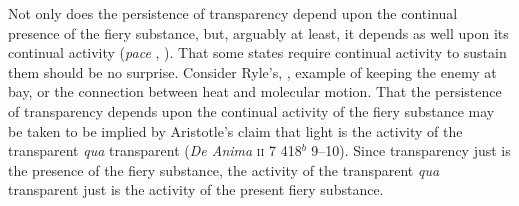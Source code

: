 Not only does the persistence of transparency depend upon the continual presence of the fiery substance, but, arguably at least, it depends as well upon its continual activity (\emph{pace} \citealt[]{Sambursky:1958aa}, \citealt[424]{Burnyeat:1995fk}). That some states require continual activity to sustain them should be no surprise. Consider Ryle's, \citeyearpar[149]{Ryle:1949qr}, example of keeping the enemy at bay, or the connection between heat and molecular motion. That the persistence of transparency depends upon the continual activity of the fiery substance may be taken to be implied by Aristotle's claim that light is the activity of the transparent \emph{qua} transparent (\emph{De Anima} \textsc{ii} 7 418\( ^{b} \) 9--10). Since transparency just is the presence of the fiery substance, the activity of the transparent \emph{qua} transparent just is the activity of the present fiery substance.

